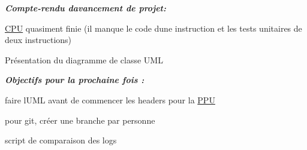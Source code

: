 {\itshape {\bfseries Compte-\/rendu d\textquotesingle{}avancement de projet\+:}}
\begin{DoxyItemize}
\item \hyperlink{struct_c_p_u}{C\+PU} quasiment finie (il manque le code d\textquotesingle{}une instruction et les tests unitaires de deux instructions)
\item Présentation du diagramme de classe U\+ML
\end{DoxyItemize}

{\itshape {\bfseries Objectifs pour la prochaine fois \+:}}
\begin{DoxyItemize}
\item faire l\textquotesingle{}U\+ML avant de commencer les headers pour la \hyperlink{struct_p_p_u}{P\+PU}
\item pour git, créer une branche par personne
\item script de comparaison des logs 
\end{DoxyItemize}